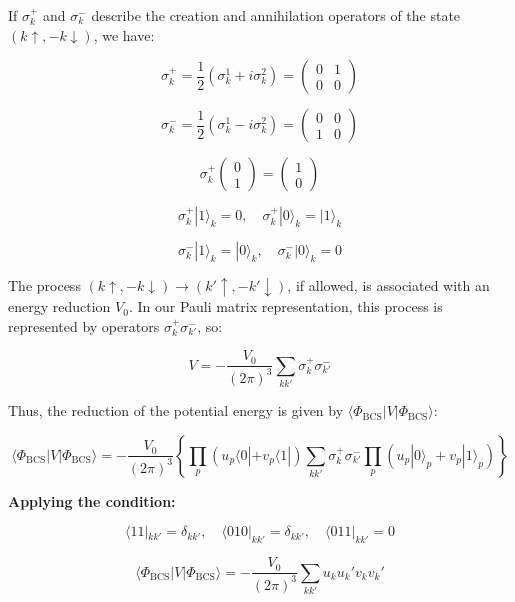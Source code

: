 \documentclass{article}
\begin{document}
If \( \sigma_k^+ \) and \( \sigma_k^- \) describe the creation and annihilation operators of the state \( (k \uparrow, -k \downarrow) \), we have:

\[
\sigma_k^+ = \frac{1}{2} \left( \sigma_k^1 + i \sigma_k^2 \right) = \begin{pmatrix} 0 & 1 \\ 0 & 0 \end{pmatrix}
\]

\[
\sigma_k^- = \frac{1}{2} \left( \sigma_k^1 - i \sigma_k^2 \right) = \begin{pmatrix} 0 & 0 \\ 1 & 0 \end{pmatrix}
\]

\[
\sigma_k^+ \begin{pmatrix} 0 \\ 1 \end{pmatrix} = \begin{pmatrix} 1 \\ 0 \end{pmatrix}
\]

\[
\sigma_k^+ |1\rangle_k = 0, \quad \sigma_k^+ |0\rangle_k = |1\rangle_k
\]

\[
\sigma_k^- |1\rangle_k = |0\rangle_k, \quad \sigma_k^- |0\rangle_k = 0
\]

The process \( (k \uparrow, -k \downarrow) \rightarrow (k' \uparrow, -k' \downarrow) \), if allowed, is associated with an energy reduction \( V_0 \). In our Pauli matrix representation, this process is represented by operators \( \sigma_k^+ \sigma_{k'}^- \), so:

\[
V = - \frac{V_0}{(2\pi)^3} \sum_{k k'} \sigma_k^+ \sigma_{k'}^-
\]

Thus, the reduction of the potential energy is given by \( \langle \Phi_{\text{BCS}} | V | \Phi_{\text{BCS}} \rangle \):

\[
\langle \Phi_{\text{BCS}} | V | \Phi_{\text{BCS}} \rangle = - \frac{V_0}{(2\pi)^3} \left\{ \prod_p \left( u_p \langle 0 | + v_p \langle 1 | \right) \sum_{k k'} \sigma_k^+ \sigma_{k'}^- \prod_p \left( u_p |0\rangle_p + v_p |1\rangle_p \right) \right\}
\]

\textbf{Applying the condition:}

\[
\langle 1 1 |_{k k'} = \delta_{k k'}, \quad \langle 0 1 0 |_{k k'} = \delta_{k k'}, \quad \langle 0 1 1 |_{k k'} = 0
\]

\[
\langle \Phi_{\text{BCS}} | V | \Phi_{\text{BCS}} \rangle = -\frac{V_0}{(2\pi)^3} \sum_{k k'} u_k u_k' v_k v_k'
\]
\end{document}
